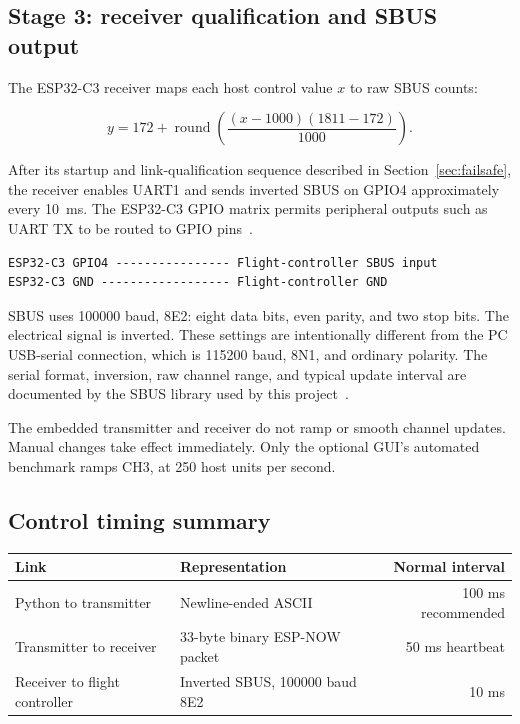 \documentclass[11pt,a4paper]{article}
\begin{document}
\subsection{Stage 3: receiver qualification and SBUS output}

The ESP32-C3 receiver maps each host control value $x$ to raw SBUS counts:

\[
y = 172 + \operatorname{round}\left(\frac{(x-1000)(1811-172)}{1000}\right).
\]

After its startup and link-qualification sequence described in
Section~\ref{sec:failsafe}, the receiver enables UART1 and sends inverted SBUS
on GPIO4 approximately every 10~ms. The ESP32-C3 GPIO matrix permits peripheral
outputs such as UART TX to be routed to GPIO pins~\cite{espressif-c3-gpio}.

\begin{lstlisting}
ESP32-C3 GPIO4 ---------------- Flight-controller SBUS input
ESP32-C3 GND ------------------ Flight-controller GND
\end{lstlisting}

SBUS uses 100000 baud, 8E2: eight data bits, even parity, and two stop bits. The
electrical signal is inverted. These settings are intentionally different from
the PC USB-serial connection, which is 115200 baud, 8N1, and ordinary polarity.
The serial format, inversion, raw channel range, and typical update interval are
documented by the SBUS library used by this project~\cite{bolderflight-sbus}.

The embedded transmitter and receiver do not ramp or smooth channel updates.
Manual changes take effect immediately. Only the optional GUI's automated
benchmark ramps CH3, at 250 host units per second.

\subsection{Control timing summary}

\begin{table}[ht]
\centering
\begin{tabularx}{\textwidth}{@{}YYr@{}}
\toprule
Link & Representation & Normal interval \\
\midrule
Python to transmitter & Newline-ended ASCII & 100 ms recommended \\
Transmitter to receiver & 33-byte binary ESP-NOW packet & 50 ms heartbeat \\
Receiver to flight controller & Inverted SBUS, 100000 baud 8E2 & 10 ms \\
\bottomrule
\end{tabularx}
\end{table}
\end{document}
